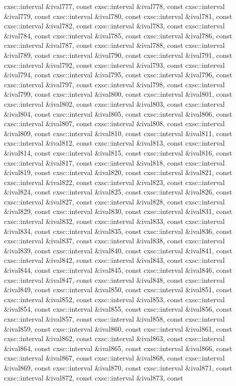 \begin{DoxyCompactItemize}
cxsc\-::interval \&ival777, const cxsc\-::interval \&ival778, const cxsc\-::interval \&ival779, const cxsc\-::interval \&ival780, const cxsc\-::interval \&ival781, const cxsc\-::interval \&ival782, const cxsc\-::interval \&ival783, const cxsc\-::interval \&ival784, const cxsc\-::interval \&ival785, const cxsc\-::interval \&ival786, const cxsc\-::interval \&ival787, const cxsc\-::interval \&ival788, const cxsc\-::interval \&ival789, const cxsc\-::interval \&ival790, const cxsc\-::interval \&ival791, const cxsc\-::interval \&ival792, const cxsc\-::interval \&ival793, const cxsc\-::interval \&ival794, const cxsc\-::interval \&ival795, const cxsc\-::interval \&ival796, const cxsc\-::interval \&ival797, const cxsc\-::interval \&ival798, const cxsc\-::interval \&ival799, const cxsc\-::interval \&ival800, const cxsc\-::interval \&ival801, const cxsc\-::interval \&ival802, const cxsc\-::interval \&ival803, const cxsc\-::interval \&ival804, const cxsc\-::interval \&ival805, const cxsc\-::interval \&ival806, const cxsc\-::interval \&ival807, const cxsc\-::interval \&ival808, const cxsc\-::interval \&ival809, const cxsc\-::interval \&ival810, const cxsc\-::interval \&ival811, const cxsc\-::interval \&ival812, const cxsc\-::interval \&ival813, const cxsc\-::interval \&ival814, const cxsc\-::interval \&ival815, const cxsc\-::interval \&ival816, const cxsc\-::interval \&ival817, const cxsc\-::interval \&ival818, const cxsc\-::interval \&ival819, const cxsc\-::interval \&ival820, const cxsc\-::interval \&ival821, const cxsc\-::interval \&ival822, const cxsc\-::interval \&ival823, const cxsc\-::interval \&ival824, const cxsc\-::interval \&ival825, const cxsc\-::interval \&ival826, const cxsc\-::interval \&ival827, const cxsc\-::interval \&ival828, const cxsc\-::interval \&ival829, const cxsc\-::interval \&ival830, const cxsc\-::interval \&ival831, const cxsc\-::interval \&ival832, const cxsc\-::interval \&ival833, const cxsc\-::interval \&ival834, const cxsc\-::interval \&ival835, const cxsc\-::interval \&ival836, const cxsc\-::interval \&ival837, const cxsc\-::interval \&ival838, const cxsc\-::interval \&ival839, const cxsc\-::interval \&ival840, const cxsc\-::interval \&ival841, const cxsc\-::interval \&ival842, const cxsc\-::interval \&ival843, const cxsc\-::interval \&ival844, const cxsc\-::interval \&ival845, const cxsc\-::interval \&ival846, const cxsc\-::interval \&ival847, const cxsc\-::interval \&ival848, const cxsc\-::interval \&ival849, const cxsc\-::interval \&ival850, const cxsc\-::interval \&ival851, const cxsc\-::interval \&ival852, const cxsc\-::interval \&ival853, const cxsc\-::interval \&ival854, const cxsc\-::interval \&ival855, const cxsc\-::interval \&ival856, const cxsc\-::interval \&ival857, const cxsc\-::interval \&ival858, const cxsc\-::interval \&ival859, const cxsc\-::interval \&ival860, const cxsc\-::interval \&ival861, const cxsc\-::interval \&ival862, const cxsc\-::interval \&ival863, const cxsc\-::interval \&ival864, const cxsc\-::interval \&ival865, const cxsc\-::interval \&ival866, const cxsc\-::interval \&ival867, const cxsc\-::interval \&ival868, const cxsc\-::interval \&ival869, const cxsc\-::interval \&ival870, const cxsc\-::interval \&ival871, const cxsc\-::interval \&ival872, const cxsc\-::interval \&ival873, const 
\end{DoxyCompactItemize}
